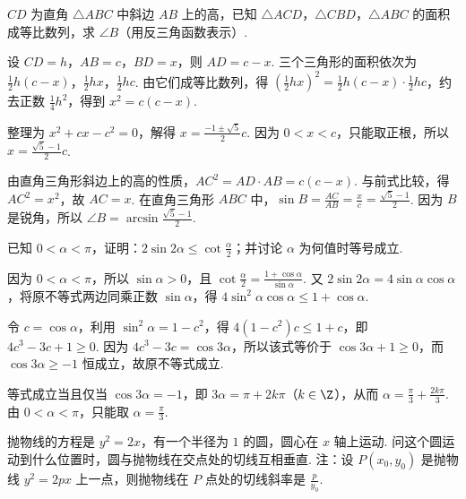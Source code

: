 \documentclass[UTF8,a4paper,oneside,11pt]{ctexbook}
\begin{document}
\begin{problem}
\(CD\) 为直角 \(\triangle ABC\) 中斜边 \(AB\) 上的高，已知 \(\triangle ACD\)，\(\triangle CBD\)，\(\triangle ABC\) 的面积成等比数列，求 \(\angle B\)（用反三角函数表示）.
\end{problem}

\begin{solution}
设 \(CD=h\)，\(AB=c\)，\(BD=x\)，则 \(AD=c-x\). 三个三角形的面积依次为 \(\frac12h(c-x)\)，\(\frac12hx\)，\(\frac12hc\). 由它们成等比数列，得 \(\left(\frac12hx\right)^2=\frac12h(c-x)\cdot\frac12hc\)，约去正数 \(\frac14h^2\)，得到 \(x^2=c(c-x)\).

整理为 \(x^2+cx-c^2=0\)，解得 \(x=\frac{-1\pm\sqrt{5}}{2}c\). 因为 \(0<x<c\)，只能取正根，所以 \(x=\frac{\sqrt{5}-1}{2}c\).

由直角三角形斜边上的高的性质，\(AC^2=AD\cdot AB=c(c-x)\). 与前式比较，得 \(AC^2=x^2\)，故 \(AC=x\). 在直角三角形 \(ABC\) 中，\(\sin B=\frac{AC}{AB}=\frac{x}{c}=\frac{\sqrt{5}-1}{2}\). 因为 \(B\) 是锐角，所以 \(\angle B=\arcsin\frac{\sqrt{5}-1}{2}\).
\end{solution}

\begin{problem}
已知 \(0 < \alpha < \pi\)，证明：\(2\sin 2\alpha\leqslant\cot\frac{\alpha}{2}\)；并讨论 \(\alpha\) 为何值时等号成立.
\end{problem}

\begin{solution}
因为 \(0<\alpha<\pi\)，所以 \(\sin\alpha>0\)，且 \(\cot\frac{\alpha}{2}=\frac{1+\cos\alpha}{\sin\alpha}\). 又 \(2\sin 2\alpha=4\sin\alpha\cos\alpha\)，将原不等式两边同乘正数 \(\sin\alpha\)，得 \(4\sin^{2}\alpha\cos\alpha\leqslant1+\cos\alpha\).

令 \(c=\cos\alpha\)，利用 \(\sin^{2}\alpha=1-c^{2}\)，得 \(4(1-c^{2})c\leqslant1+c\)，即 \(4c^{3}-3c+1\geqslant0\). 因为 \(4c^{3}-3c=\cos 3\alpha\)，所以该式等价于 \(\cos 3\alpha+1\geqslant0\)，而 \(\cos 3\alpha\geqslant-1\) 恒成立，故原不等式成立.

等式成立当且仅当 \(\cos 3\alpha=-1\)，即 \(3\alpha=\pi+2k\pi\)（\(k\in\Z\)），从而 \(\alpha=\frac{\pi}{3}+\frac{2k\pi}{3}\). 由 \(0<\alpha<\pi\)，只能取 \(\alpha=\frac{\pi}{3}\).
\end{solution}

\begin{problem}
抛物线的方程是 \(y^{2}=2x\)，有一个半径为 \(1\) 的圆，圆心在 \(x\) 轴上运动. 问这个圆运动到什么位置时，圆与抛物线在交点处的切线互相垂直.
注：设 \(P(x_0,y_0)\) 是抛物线 \(y^{2}=2px\) 上一点，则抛物线在 \(P\) 点处的切线斜率是 \(\frac{p}{y_0}\).
\end{problem}
\end{document}
